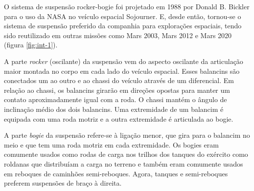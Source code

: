 \documentclass[12pt]{article}
\begin{document}
\newlength{\currentparskip}
\newlength{\currentparindent}
\setlength{\currentparskip}{\parskip}
\setlength{\currentparindent}{\parindent}
\begin{minipage}{.53\textwidth}
  \setlength{\parskip}{\currentparskip}
  \setlength{\parindent}{\currentparindent}
  O sistema de suspensão rocker-bogie foi projetado em 1988 por Donald B. Bickler para o uso da NASA no veículo espacial Sojourner. E, desde então, tornou-se o sistema de suspensão preferido da companhia para explorações espaciais, tendo sido reutilizado em outras missões como Mars 2003, Mars 2012 e Mars 2020 (figura \ref{fig:int-1}).
  \medskip

  A parte \emph{rocker} (oscilante) da suspensão vem do aspecto oscilante da articulação maior montada no corpo em cada lado do veículo espacial. Esses balancins são conectados um ao outro e ao chassi do veículo através de um diferencial. Em relação ao chassi, os balancins girarão em direções opostas para manter um contato aproximadamente igual com a roda. O chassi mantém o ângulo de inclinação médio dos dois balancins. Uma extremidade de um balancim é equipada com uma roda motriz e a outra extremidade é articulada ao bogie.
  \medskip

  A parte \emph{bogie} da suspensão refere-se à ligação menor, que gira para o balancim no meio e que tem uma roda motriz em cada extremidade. Os bogies eram comumente usados como rodas de carga nos trilhos dos tanques do exército como roldanas que distribuíam a carga no terreno e também eram comumente usados em reboques de caminhões semi-reboques. Agora, tanques e semi-reboques preferem suspensões de braço à direita.
\end{minipage}%
\hfill%
\end{document}
